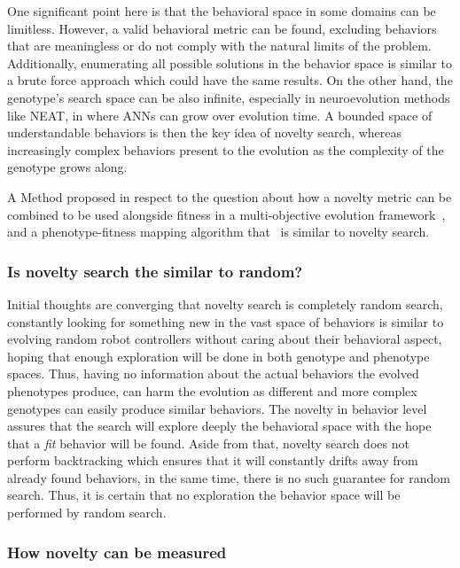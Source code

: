One significant point here is that the behavioral space in some domains can be limitless. However, a valid behavioral metric can be found, excluding behaviors that are meaningless or do not comply with the natural limits of the problem. Additionally, enumerating all possible solutions in the behavior space is similar to a brute force approach which could have the same results. On the other hand, the genotype's search space can be also infinite, especially in neuroevolution methods like NEAT, in where ANNs can grow over evolution time. A bounded space of understandable behaviors is then the key idea of novelty search, whereas increasingly complex behaviors present to the evolution as the complexity of the genotype grows along.

A Method proposed in respect to the question about how a novelty metric can be combined to be used alongside fitness in a multi-objective evolution framework~\cite{mouret2011novelty}, and a phenotype-fitness mapping algorithm that~\cite{mouret2012algorithm} is similar to novelty search.

\subsubsection*{Is novelty search the similar to random?}

Initial thoughts are converging that novelty search is completely random search, constantly looking for something new in the vast space of behaviors is similar to evolving random robot controllers without caring about their behavioral aspect, hoping that enough exploration will be done in both genotype and phenotype spaces. Thus, having no information about the actual behaviors the evolved phenotypes produce, can harm the evolution as different and more complex genotypes can easily produce similar behaviors. The novelty in behavior level assures that the search will explore deeply the behavioral space with the hope that a \emph{fit} behavior will be found. Aside from that, novelty search does not perform backtracking which ensures that it will constantly drifts away from already found behaviors, in the same time, there is no such guarantee for random search. Thus, it is certain that no exploration the behavior space will be performed by random search.



\subsubsection*{How novelty can be measured}

